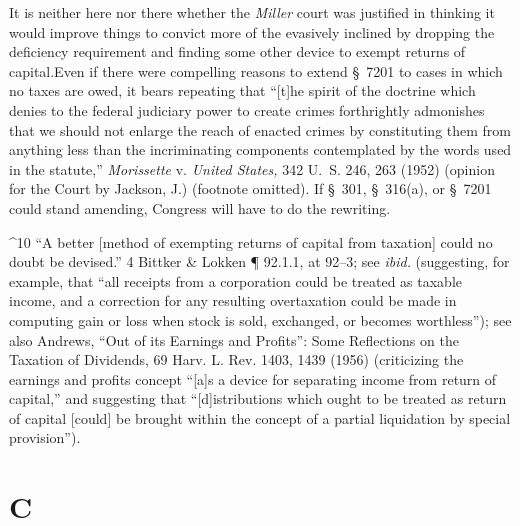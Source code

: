   It is neither here nor there whether the \emph{Miller} court was
justified in thinking it would improve things to convict more of the
evasively inclined by dropping the deficiency requirement and finding
some other device to exempt returns of capital.\footnotemark[10] Even if there were
compelling reasons to extend \newpage  \S~7201 to cases in which no taxes
are owed, it bears repeating that ``[t]he spirit of the doctrine which
denies to the federal judiciary power to create crimes forthrightly
admonishes that we should not enlarge the reach of enacted crimes by
constituting them from anything less than the incriminating components
contemplated by the words used in the statute,'' \emph{Morissette} v.
\emph{United States,} 342 U.~S. 246, 263 (1952) (opinion for the Court by
Jackson, J.) (footnote omitted). If \S~301, \S~316(a), or \S~7201
could stand amending, Congress will have to do the rewriting.

^10 ``A better [method of exempting returns of capital from taxation]
could no doubt be devised.'' 4 Bittker \& Lokken ¶ 92.1.1, at 92--3;
see \emph{ibid.} (suggesting, for example, that ``all receipts from a
corporation could be treated as taxable income, and a correction for
any resulting overtaxation could be made in computing gain or loss when
stock is sold, exchanged, or becomes worthless''); see also Andrews,
``Out of its Earnings and Profits'': Some Reflections on the Taxation
of Dividends, 69 Harv. L. Rev. 1403, 1439 (1956) (criticizing the
earnings and profits concept ``[a]s a device for separating income from
return of capital,'' and suggesting that ``[d]istributions which ought
to be treated as return of capital [could] be brought within the concept
of a partial liquidation by special provision'').

\section{C}

